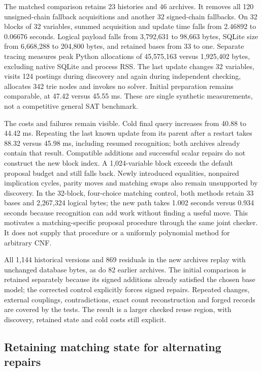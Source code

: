 \documentclass[11pt,a4paper]{article}
\numberwithin{equation}{section}
\theoremstyle{plain}
\theoremstyle{definition}
\theoremstyle{remark}
\begin{document}
The matched comparison retains 23 histories and 46 archives. It removes all 120 unsigned-chain fallback acquisitions and another 32 signed-chain fallbacks. On 32 blocks of 32 variables, summed acquisition and update time falls from 2.46892 to 0.06676 seconds. Logical payload falls from 3,792,631 to 98,663 bytes, SQLite size from 6,668,288 to 204,800 bytes, and retained bases from 33 to one. Separate tracing measures peak Python allocations of 45,575,163 versus 1,925,402 bytes, excluding native SQLite and process RSS. The last update changes 32 variables, visits 124 postings during discovery and again during independent checking, allocates 342 trie nodes and invokes no solver. Initial preparation remains comparable, at 47.42 versus 45.55 ms. These are single synthetic measurements, not a competitive general SAT benchmark.

The costs and failures remain visible. Cold final query increases from 40.88 to 44.42 ms. Repeating the last known update from its parent after a restart takes 88.32 versus 45.98 ms, including resumed recognition; both archives already contain that result. Compatible additions and successful scalar repairs do not construct the new block index. A 1,024-variable block exceeds the default proposal budget and still falls back. Newly introduced equalities, nonpaired implication cycles, parity moves and matching swaps also remain unsupported by discovery. In the 32-block, four-choice matching control, both methods retain 33 bases and 2,267,324 logical bytes; the new path takes 1.002 seconds versus 0.934 seconds because recognition can add work without finding a useful move. This motivates a matching-specific proposal procedure through the same joint checker. It does not supply that procedure or a uniformly polynomial method for arbitrary CNF.

All 1,144 historical versions and 869 residuals in the new archives replay with unchanged database bytes, as do 82 earlier archives. The initial comparison is retained separately because its signed additions already satisfied the chosen base model; the corrected control explicitly forces signed repairs. Repeated changes, external couplings, contradictions, exact count reconstruction and forged records are covered by the tests. The result is a larger checked reuse region, with discovery, retained state and cold costs still explicit.

\subsection{Retaining matching state for alternating repairs}
\label{sec:matching-history}
\end{document}
